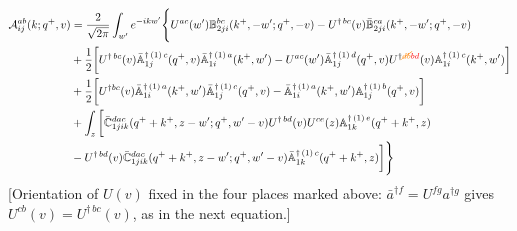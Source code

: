 \documentclass[aps,prd,amsmath,amssymb,nofootinbib]{revtex4-2}
\def\mf#1{\mathbb{#1}}
\numberwithin{equation}{section}
\begin{document}
\begin{align}
     {\cal A}^{ab}_{ij}(k; q^+, v) & = \frac{2}{\sqrt{2\pi}} \int_{w^{\prime}}e^{-i k w^\prime}\Bigg\{U^{ac}(w^{\prime}) \mf{B}^{bc}_{2ji}(k^{+},-w^{\prime};q^{+},-v)-U^{\dagger\,bc}(v)\Bar{\mf{B}}^{ca}_{2ji}(k^{+},-w^{\prime}; q^{+},-v)\notag \\ & +\frac{1}{2}\bigg[U^{\dagger\, bc}(v)\Bar{\mf{A}}^{\dagger\,(1)\, c}_{1j}(q^{+},v)\Bar{\mf{A}}^{\dagger\,(1)\, a}_{1i}(k^{+},w^{\prime})-U^{ac}(w^{\prime}) \Bar{\mf{A}}^{\dagger\,(1)\, d}_{1j}(q^{+},v)U^{\dagger {\color{orange}\cancel{db}}{\color{red}bd}}(v) \mf{A}^{\dagger\,(1)\, c}_{1i}(k^{+},w^{\prime})\bigg]\notag \\ & +\frac{1}{2}\bigg[U^{\dagger bc}(v)\Bar{\mf{A}}^{\dagger\, (1)\, a}_{1i}(k^{+},w^{\prime})\Bar{\mf{A}}^{\dagger \, (1)\, c}_{1j}(q^{+},v)-\Bar{\mf{A}}^{\dagger\,(1)\, a}_{1i}(k^{+},w^{\prime}) \mf{A}^{\dagger\,(1)\, b}_{1j}(q^{+},v)\bigg]\notag \\ & +\int_{z}\bigg[\Bar{\mf{C}}^{dac}_{1jik}(q^{+}+k^{+},z-w^{\prime}; q^{+},w^{\prime}-v)U^{\dagger\, bd}(v)U^{ce}(z) \mf{A}^{\dagger\,(1)\,e}_{1k}(q^{+}+k^{+},z)\notag \\ &-U^{\dagger\, bd}(v) \Bar{\mf{C}}^{dac}_{1jik}(q^{+}+k^{+},z-w^{\prime}; q^{+},w^{\prime}-v)\Bar{\mf{A}}^{\dagger\,(1)\,c}_{1k}(q^{+}+k^{+},z)\bigg]\Bigg\}
\end{align} {\color{red}[Orientation of $U(v)$ fixed in the four places marked above: $\bar a^{\dagger f}=U^{fg}a^{\dagger g}$ gives $U^{cb}(v)=U^{\dagger\, bc}(v)$, as in the next equation.]}\par\noindent 
\end{document}
